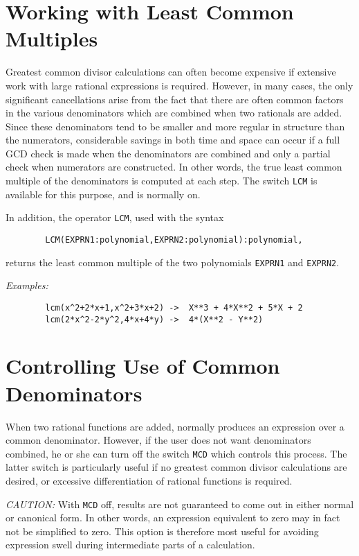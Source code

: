 \section{Working with Least Common Multiples}

Greatest common divisor calculations can often become expensive if
extensive work with large rational expressions is required. However, in
many cases, the only significant cancellations arise from the fact that
there are often common factors in the various denominators which are
combined when two rationals are added. Since these denominators tend to be
smaller and more regular in structure than the numerators, considerable
savings in both time and space can occur if a full GCD check is made when
the denominators are combined and only a partial check when numerators are
constructed. In other words, the true least common multiple of the
denominators is computed at each step. The switch {\tt LCM}
is available for this purpose, and is normally on.

In addition, the operator {\tt LCM}, used with the syntax
\begin{verbatim}
        LCM(EXPRN1:polynomial,EXPRN2:polynomial):polynomial,
\end{verbatim}
returns the least common multiple of the two polynomials {\tt EXPRN1} and
{\tt EXPRN2}.

{\it Examples:}
\begin{verbatim}
        lcm(x^2+2*x+1,x^2+3*x+2) ->  X**3 + 4*X**2 + 5*X + 2
        lcm(2*x^2-2*y^2,4*x+4*y) ->  4*(X**2 - Y**2)
\end{verbatim}

\section{Controlling Use of Common Denominators}

When two rational functions are added, {\REDUCE} normally produces an
expression over a common denominator. However, if the user does not want
denominators combined, he or she can turn off the switch {\tt MCD}
 which controls this process.  The latter switch is
particularly useful if no greatest common divisor calculations are
desired, or excessive differentiation of rational functions is required.

{\it CAUTION:}  With {\tt MCD} off, results are not guaranteed to come out in
either normal or canonical form.  In other words, an expression equivalent
to zero may in fact not be simplified to zero.  This option is therefore
most useful for avoiding expression swell during intermediate parts of a
calculation.

